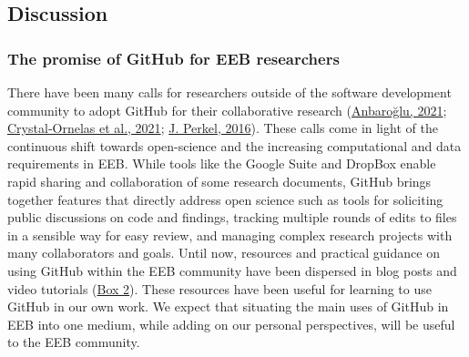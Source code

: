 \hypertarget{discussion}{%
\subsection{Discussion}\label{discussion}}

\hypertarget{the-promise-of-github-for-eeb-researchers}{%
\subsubsection{The promise of GitHub for EEB researchers}\label{the-promise-of-github-for-eeb-researchers}}

There have been many calls for researchers outside of the software development community to adopt GitHub for their collaborative research (\protect\hyperlink{ref-UsTxAq4f}{Anbaroğlu, 2021}; \protect\hyperlink{ref-1Du6fzB8g}{Crystal‐Ornelas et al., 2021}; \protect\hyperlink{ref-10ghgV3S8}{J. Perkel, 2016}).
These calls come in light of the continuous shift towards open-science and the increasing computational and data requirements in EEB.
While tools like the Google Suite and DropBox enable rapid sharing and collaboration of some research documents, GitHub brings together features that directly address open science such as tools for soliciting public discussions on code and findings, tracking multiple rounds of edits to files in a sensible way for easy review, and managing complex research projects with many collaborators and goals.
Until now, resources and practical guidance on using GitHub within the EEB community have been dispersed in blog posts and video tutorials (\protect\hyperlink{tips}{Box 2}).
These resources have been useful for learning to use GitHub in our own work.
We expect that situating the main uses of GitHub in EEB into one medium, while adding on our personal perspectives, will be useful to the EEB community.


